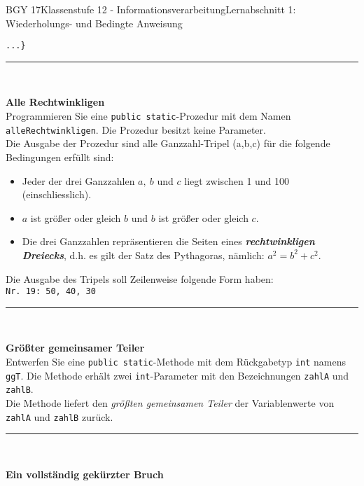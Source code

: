 \documentclass[oneside,openany,headings=optiontotoc,11pt,numbers=noenddot]{scrreprt}
\begin{document}
\begin{worksheet}{BGY 17}{Klassenstufe 12 - Informationsverarbeitung}{Lernabschnitt 1: Wiederholungs- und Bedingte Anweisung}
\begin{framed}
\begin{lstlisting}[style=JavaInputStyle]
				...}
			\end{lstlisting}
			\par\noindent
			\rule{\textwidth}{0.1pt}\\
			\par\noindent
			\textbf{Alle Rechtwinkligen}\\
			Programmieren Sie eine \lstinline[style=JavaInputStyle]|public static|-Prozedur mit dem Namen \lstinline[style=JavaInputStyle]|alleRechtwinkligen|. Die Prozedur besitzt keine Parameter.\\
			Die Ausgabe der Prozedur sind alle Ganzzahl-Tripel (a,b,c) für die folgende Bedingungen erfüllt sind:
			\begin{itemize}
				\item Jeder der drei Ganzzahlen \(a,\ b\) und \(c\) liegt zwischen 1 und 100 (einschliesslich).
				\item \(a\) ist größer oder gleich \(b\) und \(b\) ist größer oder gleich \(c\).
				\item Die drei Ganzzahlen repräsentieren die Seiten eines \textit{\textbf{rechtwinkligen Dreiecks}}, d.h. es gilt der \grq{}Satz des Pythagoras\grq{}, nämlich: \(a^2 = b^2 + c^2\).
			\end{itemize}
			Die Ausgabe des Tripels soll Zeilenweise folgende Form haben:\\
			\lstinline[style=JavaInputStyle]|Nr. 19: 50, 40, 30|\\
			\par\noindent
			\rule{\textwidth}{0.1pt}\\
			\par\noindent
			\textbf{Größter gemeinsamer Teiler}\\
			Entwerfen Sie eine \lstinline[style=JavaInputStyle]|public static|-Methode mit dem Rückgabetyp \lstinline[style=JavaInputStyle]|int| namens \lstinline[style=JavaInputStyle]|ggT|. Die Methode erhält zwei \lstinline[style=JavaInputStyle]|int|-Parameter mit den Bezeichnungen \lstinline[style=JavaInputStyle]|zahlA| und \lstinline[style=JavaInputStyle]|zahlB|.\\
			Die Methode liefert den \textit{größten gemeinsamen Teiler} der Variablenwerte von \lstinline[style=JavaInputStyle]|zahlA| und \lstinline[style=JavaInputStyle]|zahlB| zurück.\\
			\par\noindent
			\rule{\textwidth}{0.1pt}\\
			\par\noindent
			\textbf{Ein vollständig gekürzter Bruch}\\

\end{framed}
\end{worksheet}
\end{document}
